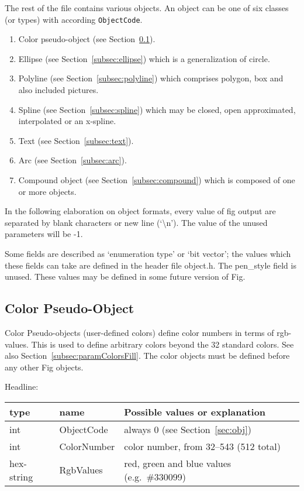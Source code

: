\documentclass[10pt, a4paper]{article}%
\begin{document}
The rest of the file contains various objects.  
An object can be one of six classes (or types) with according \texttt{ObjectCode}.
%
\begin{enumerate}
\item[0]
Color pseudo-object (see Section~\ref{subsec:colorPseudoObj}). 
\item
Ellipse (see Section~\ref{subsec:ellipse}) which is a generalization of circle.
\item
Polyline (see Section~\ref{subsec:polyline}) which comprises polygon, 
box and also included pictures.
\item
Spline (see Section~\ref{subsec:spline}) 
which may be closed, open approximated, interpolated or an x-spline.
\item
Text (see Section~\ref{subsec:text}).
\item
Arc (see Section~\ref{subsec:arc}).
\item
Compound object (see Section~\ref{subsec:compound}) 
which is composed of one or more objects. 
\end{enumerate}

In the following elaboration on object formats, 
every value of fig output are separated by blank characters 
or new line (`\textbackslash{}n').  
The value of the unused parameters will be -1.

 Some fields are described as `enumeration type' or `bit vector'; the
 values which these fields can take are defined in the header file object.h.
 The pen\_style field is unused.
 These values may be defined in some future version of Fig.


\setcounter{subsection}{-1}
\subsection{Color Pseudo-Object}\label{subsec:colorPseudoObj}

Color Pseudo-objects (user-defined colors) 
define color numbers in terms of rgb-values. 
This is used to define arbitrary colors beyond the 32 standard colors. 
See also Section~\ref{subsec:paramColorsFill}. 
The color objects must be defined before any other Fig objects.

\noindent
Headline: \\
%
\begin{tabular}{lll}
\toprule
type & name & Possible values or explanation \\
\midrule
\midrule
int        & ObjectCode  & always 0 (see Section~\ref{sec:obj}) \\
int        & ColorNumber & color number, from 32--543 (512 total)\\
hex-string & RgbValues   & red, green and blue values (e.g.~\#330099) \\
\bottomrule
\end{tabular}
\end{document}
